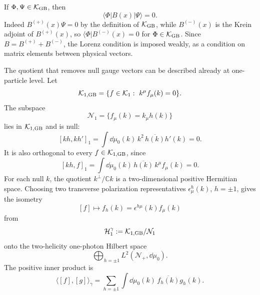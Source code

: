 \begin{remark}
\label{rem:gupta-bleuler-weak-lorenz-condition}
If \(\Phi,\Psi\in\mathcal K_{\rm GB}\), then
\[
  \langle\Phi|B(x)|\Psi\rangle=0 .
\]
Indeed \(B^{(+)}(x)\Psi=0\) by the definition of
\(\mathcal K_{\rm GB}\), while \(B^{(-)}(x)\) is the Krein adjoint of
\(B^{(+)}(x)\), so \(\langle\Phi|B^{(-)}(x)=0\) for
\(\Phi\in\mathcal K_{\rm GB}\).  Since \(B=B^{(+)}+B^{(-)}\), the Lorenz
condition is imposed weakly, as a condition on matrix elements between
physical vectors.
\end{remark}

\begin{construction}
\label{cons:gupta-bleuler-one-particle-quotient}
The quotient that removes null gauge vectors can be described already at
one-particle level.  Let
\[
  \mathcal K_{1,{\rm GB}}
  =
  \{f\in\mathcal K_1:\ k^\mu f_\mu(k)=0\}.
\]
The subspace
\[
  \mathcal N_1
  =
  \{f_\mu(k)=k_\mu h(k)\}
\]
lies in \(\mathcal K_{1,{\rm GB}}\) and is null:
\[
  [kh,kh']_1
  =
  \int\dd\mu_0(k)\,k^2\,\overline{h(k)}h'(k)=0 .
\]
It is also orthogonal to every \(f\in\mathcal K_{1,{\rm GB}}\), since
\[
  [kh,f]_1
  =
  \int\dd\mu_0(k)\,\overline{h(k)}\,k^\mu f_\mu(k)=0 .
\]
For each null \(k\), the quotient \(k^\perp/\mathbb C k\) is a two-dimensional
positive Hermitian space.  Choosing two transverse polarization
representatives \(\epsilon_\mu^h(k)\), \(h=\pm1\), gives the isometry
\[
  [f]\longmapsto
  f_h(k)=\epsilon^{h\mu}(k)f_\mu(k)
\]
from
\[
  \mathcal H_1^\gamma
  :=
  \mathcal K_{1,{\rm GB}}/\mathcal N_1
\]
onto the two-helicity one-photon Hilbert space
\[
  \bigoplus_{h=\pm1}L^2(\mathcal N_+,\dd\mu_0).
\]
The positive inner product is
\[
  \langle[f],[g]\rangle_{\gamma}
  =
  \sum_{h=\pm1}
  \int\dd\mu_0(k)\,
  \overline{f_h(k)}g_h(k).
\]
\end{construction}

